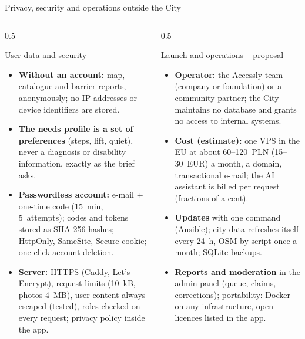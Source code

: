 \begin{frame}{Privacy, security and operations outside the City}
  \begin{columns}[T,onlytextwidth]
    \begin{column}{0.5\textwidth}
      \begin{block}{User data and security}
        \footnotesize
        \begin{itemize}
          \item \textbf{Without an account:} map, catalogue and barrier reports, anonymously; no IP addresses
                or device identifiers are stored.
          \item \textbf{The needs profile is a set of preferences} (steps, lift, quiet), never a diagnosis or
                disability information, exactly as the brief asks.
          \item \textbf{Passwordless account:} e-mail + one-time code (15~min, 5~attempts); codes and tokens stored
                as SHA-256 hashes; HttpOnly, SameSite, Secure cookie; one-click account deletion.
          \item \textbf{Server:} HTTPS (Caddy, Let's Encrypt), request limits (10~kB, photos 4~MB), user content always
                escaped (tested), roles checked on every request; privacy policy inside the app.
        \end{itemize}
      \end{block}
    \end{column}
    \begin{column}{0.5\textwidth}
      \begin{block}{Launch and operations -- proposal}
        \footnotesize
        \begin{itemize}
          \item \textbf{Operator:} the Accessly team (company or foundation) or a community partner; the City
                maintains no database and grants no access to internal systems.
          \item \textbf{Cost (estimate):} one VPS in the EU at about 60--120~PLN (15--30~EUR) a month, a domain,
                transactional e-mail; the AI assistant is billed per request (fractions of a cent).
          \item \textbf{Updates} with one command (Ansible); city data refreshes itself every 24~h,
                OSM by script once a month; SQLite backups.
          \item \textbf{Reports and moderation} in the admin panel (queue, claims, corrections);
                portability: Docker on any infrastructure, open licences listed in the app.
        \end{itemize}
      \end{block}
    \end{column}
  \end{columns}


\end{frame}
